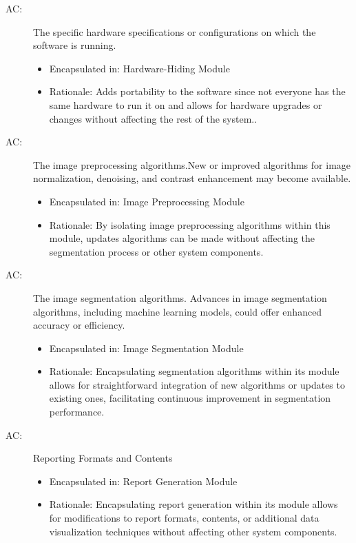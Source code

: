 \documentclass[12pt, titlepage]{article}
\newcounter{acnum}
\newcommand{\actheacnum}{AC\theacnum}
\begin{document}
\begin{description}
\item[ \actheacnum \label{1_ac}:] The specific hardware specifications or configurations on which the software is running.
\begin{itemize}
    \item Encapsulated in: Hardware-Hiding Module
    \item Rationale: Adds portability to the software since not everyone has the same hardware to run it on and allows for hardware upgrades or changes without affecting the rest of the system..
\end{itemize}
\item[ \actheacnum \label{2_ac}:] The image preprocessing algorithms.New or improved algorithms for image normalization, denoising, and contrast enhancement may become available.
\begin{itemize}
    \item Encapsulated in: Image Preprocessing Module
    \item Rationale: By isolating image preprocessing algorithms within this module, updates algorithms can be made without affecting the segmentation process or other system components.
\end{itemize}

\item[ \actheacnum \label{3_ac}:] The image segmentation algorithms. Advances in image segmentation algorithms, including machine learning models, could offer enhanced accuracy or efficiency.
\begin{itemize}
    \item Encapsulated in: Image Segmentation Module
    \item Rationale: Encapsulating segmentation algorithms within its module allows for straightforward integration of new algorithms or updates to existing ones, facilitating continuous improvement in segmentation performance.
\end{itemize}
\item[ \actheacnum \label{4_ac}:] Reporting Formats and Contents
\begin{itemize}
    \item Encapsulated in: Report Generation Module
    \item Rationale: Encapsulating report generation within its module allows for modifications to report formats, contents, or additional data visualization techniques without affecting other system components.
\end{itemize}


\end{description}
\end{document}
